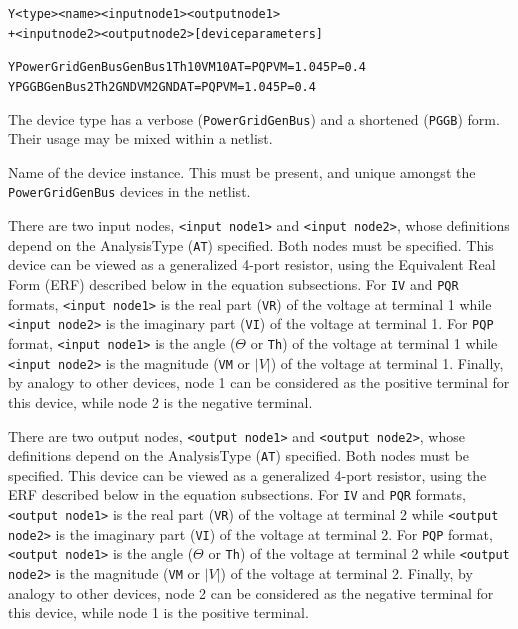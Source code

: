\begin{Device}\label{PowerGridGenBus}

\device
\begin{alltt}
Y<type> <name> <input node1> <output node1> 
+ <input node2> <output node2> [device parameters] 
\end{alltt}
  
\examples
\begin{alltt}
YPowerGridGenBus GenBus1 Th1 0 VM1 0 AT=PQP VM=1.045 P=0.4
YPGGB GenBus2 Th2 GND VM2 GND AT=PQP VM=1.045 P=0.4
\end{alltt}

\parameters 
\begin{Parameters}
The device type has a verbose (\texttt{PowerGridGenBus}) and a shortened
(\texttt{PGGB}) form.  Their usage may be mixed within a netlist.

Name of the device instance.  This must be present, and unique amongst the 
\texttt{PowerGridGenBus} devices in the netlist.

There are two input nodes, \texttt{<input node1>} and \texttt{<input node2>}, 
whose definitions depend on the AnalysisType (\texttt{AT}) specified.  Both nodes
must be specified.  This device can be viewed as a generalized 4-port resistor, using
the Equivalent Real Form (ERF) described below in the equation subsections. For 
\texttt{IV} and \texttt{PQR} formats, \texttt{<input node1>} is the real part 
(\texttt{VR}) of the voltage at terminal 1 while \texttt{<input node2>} is the 
imaginary part (\texttt{VI}) of the voltage at terminal 1.  
For \texttt{PQP} format, \texttt{<input node1>} is the angle ($\Theta$ or \texttt{Th}) of the voltage 
at terminal 1 while \texttt{<input node2>} is the magnitude (\texttt{VM} or $|V|$) of the 
voltage at terminal 1.  Finally, by analogy to other \Xyce{} devices, node 1 can be 
considered as the positive terminal for this device, while node 2 is the negative
terminal.

There are two output nodes, \texttt{<output node1>} and \texttt{<output node2>}, 
whose definitions depend on the AnalysisType (\texttt{AT}) specified.  Both nodes
must be specified.  This device can be viewed as a generalized 4-port resistor, 
using the ERF described below in the equation subsections. For \texttt{IV} 
and \texttt{PQR} formats, \texttt{<output node1>} is the real part (\texttt{VR}) of 
the voltage at terminal 2 while \texttt{<output node2>} is the imaginary part 
(\texttt{VI}) of the voltage at terminal 2.  
For \texttt{PQP} format, \texttt{<output node1>} is the angle ($\Theta$ or \texttt{Th}) of the voltage 
at terminal 2 while \texttt{<output node2>} is the magnitude (\texttt{VM} or $|V|$) of the 
voltage at terminal 2.  Finally, by analogy to other \Xyce{} devices, node 2 can be 
considered as the negative terminal for this device, while node 1 is the positive
terminal.


\end{Parameters}
\end{Device}
